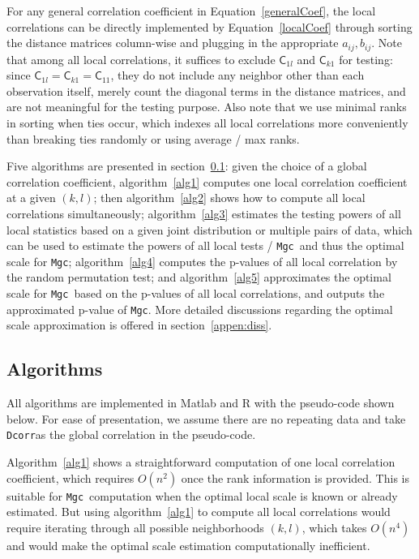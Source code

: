 \documentclass[11pt]{article}
\providecommand{\sct}[1]{{\sc \texttt{#1}}}
\newcommand{\G}{\mathsf{C}}
\newcommand{\Mgc}{\sct{Mgc}}
\newcommand{\Dcorr}{\sct{Dcorr}}
\begin{document}
For any general correlation coefficient in Equation~\ref{generalCoef}, the local correlations can be directly implemented by Equation~\ref{localCoef} through sorting the distance matrices column-wise and plugging in the appropriate $a_{ij}, b_{ij}$. Note that among all local correlations, it suffices to exclude $\G_{1l}$ and $\G_{k1}$ for testing: since $\G_{1l}=\G_{k1}=\G_{11}$, they do not include any neighbor other than each observation itself, merely count the diagonal terms in the distance matrices, and are not meaningful for the testing purpose. Also note that we use minimal ranks in sorting when ties occur, which indexes all local correlations more conveniently than breaking ties randomly or using average / max ranks.

Five algorithms are presented in section~\ref{appen:algorithms}: given the choice of a global correlation coefficient, algorithm~\ref{alg1} computes one local correlation coefficient at a given $(k,l)$; then algorithm~\ref{alg2} shows how to compute all local correlations simultaneously; algorithm~\ref{alg3} estimates the testing powers of all local statistics based on a given joint distribution or multiple pairs of data, which can be used to estimate the powers of all local tests / \Mgc~and thus the optimal scale for \Mgc; algorithm~\ref{alg4} computes the p-values of all local correlation by the random permutation test; and algorithm~\ref{alg5} approximates the optimal scale for \Mgc~based on the p-values of all local correlations, and outputs the approximated p-value of \Mgc. More detailed discussions regarding the optimal scale approximation is offered in section~\ref{appen:diss}.

\subsection{Algorithms}
\label{appen:algorithms}
All algorithms are implemented in Matlab and R with the pseudo-code shown below. For ease of presentation, we assume there are no repeating data and take \Dcorr as the global correlation in the pseudo-code.

Algorithm~\ref{alg1} shows a straightforward computation of one local correlation coefficient, which requires $O(n^2)$ once the rank information is provided. This is suitable for \Mgc~computation when the optimal local scale is known or already estimated. But using algorithm~\ref{alg1} to compute all local correlations would require iterating through all possible neighborhoods $(k,l)$, which takes $O(n^4)$ and would make the optimal scale estimation computationally inefficient. 
\end{document}
